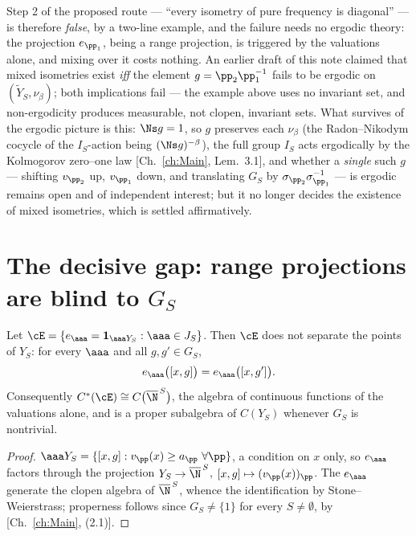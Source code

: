 \begin{remark}[Status]\label{XV:rem:ergstatus}
Step 2 of the proposed route --- ``every isometry of pure frequency is diagonal'' --- is
therefore \emph{false}, by a two-line example, and the failure needs no ergodic theory: the
projection $e_{\pp_1}$, being a range projection, is triggered by the valuations alone, and
mixing over it costs nothing. An earlier draft of this note claimed that mixed isometries
exist \emph{iff} the element $g=\pp_2\pp_1^{-1}$ fails to be ergodic on
$(\widetilde Y_S,\nu_\beta)$; both implications fail --- the example above uses no invariant
set, and non-ergodicity produces measurable, not clopen, invariant sets. What survives of the
ergodic picture is this: $\Ns g=1$, so $g$ preserves each $\nu_\beta$ (the Radon--Nikodym
cocycle of the $I_S$-action being $(\Ns g)^{-\beta}$), the full group $I_S$ acts ergodically
by the Kolmogorov zero--one law [Ch.~\ref{ch:Main}, Lem.~3.1], and whether a \emph{single} such $g$
--- shifting $v_{\pp_2}$ up, $v_{\pp_1}$ down, and translating $G_S$ by
$\sigma_{\pp_2}\sigma_{\pp_1}^{-1}$ --- is ergodic remains open and of independent interest;
but it no longer decides the existence of mixed isometries, which is settled affirmatively.
\end{remark}

\section{The decisive gap: range projections are blind to $G_S$}

\begin{theorem}\label{XV:thm:blind}
Let $\cE=\{e_\aaa=\mathbf 1_{\aaa Y_S}:\aaa\in J_S\}$. Then $\cE$ does not separate the points
of $Y_S$: for every $\aaa$ and all $g,g'\in G_S$,
\[
e_\aaa\bigl([x,g]\bigr)=e_\aaa\bigl([x,g']\bigr).
\]
Consequently $C^*(\cE)\cong C\bigl(\overline\N^{\,S}\bigr)$, the algebra of continuous
functions of the valuations alone, and is a proper subalgebra of $C(Y_S)$ whenever $G_S$ is
nontrivial.
\end{theorem}

\begin{proof}
$\aaa Y_S=\{[x,g]:v_\pp(x)\ge a_\pp\ \forall\pp\}$, a condition on $x$ only, so $e_\aaa$
factors through the projection $Y_S\to\overline\N^{\,S}$, $[x,g]\mapsto(v_\pp(x))_\pp$. The
$e_\aaa$ generate the clopen algebra of $\overline\N^{\,S}$, whence the identification by
Stone--Weierstrass; properness follows since $G_S\ne\{1\}$ for every $S\ne\emptyset$, by
[Ch.~\ref{ch:Main}, (2.1)].
\end{proof}

